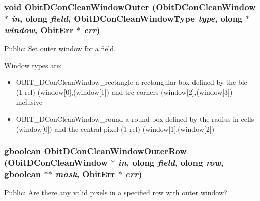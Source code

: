 \subsubsection{\setlength{\rightskip}{0pt plus 5cm}void Obit\-DCon\-Clean\-Window\-Outer ({\bf Obit\-DCon\-Clean\-Window} $\ast$ {\em in}, {\bf olong} {\em field}, {\bf Obit\-DCon\-Clean\-Window\-Type} {\em type}, {\bf olong} $\ast$ {\em window}, {\bf Obit\-Err} $\ast$ {\em err})}\label{ObitDConCleanWindow_8h_a37}


Public: Set outer window for a field. 

Window types are: \begin{itemize}
\item OBIT\_\-DCon\-Clean\-Window\_\-rectangle a rectangular box defined by the blc (1-rel) (window[0],(window[1]) and trc corners (window[2],(window[3]) inclusive \item OBIT\_\-DCon\-Clean\-Window\_\-round a round box defined by the radius in cells (window[0]) and the central pixel (1-rel) (window[1],(window[2]) 
\end{itemize}
\subsubsection{\setlength{\rightskip}{0pt plus 5cm}gboolean Obit\-DCon\-Clean\-Window\-Outer\-Row ({\bf Obit\-DCon\-Clean\-Window} $\ast$ {\em in}, {\bf olong} {\em field}, {\bf olong} {\em row}, gboolean $\ast$$\ast$ {\em mask}, {\bf Obit\-Err} $\ast$ {\em err})}\label{ObitDConCleanWindow_8h_a42}


Public: Are there any valid pixels in a specified row with outer window? 

